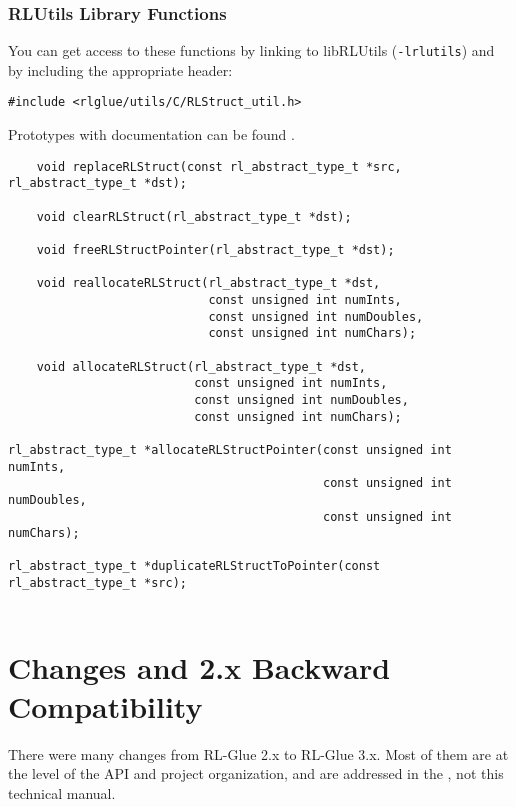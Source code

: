 \documentclass[11pt]{article}
\begin{document}
\subsubsection{RLUtils Library Functions}
\label{sec:util-functions}
You can get access to these functions by linking to libRLUtils (\texttt{-lrlutils}) and by including the appropriate header:

\begin{verbatim}
#include <rlglue/utils/C/RLStruct_util.h>
\end{verbatim}

Prototypes with documentation can be found .

\begin{verbatim}
	void replaceRLStruct(const rl_abstract_type_t *src, rl_abstract_type_t *dst);

	void clearRLStruct(rl_abstract_type_t *dst);

	void freeRLStructPointer(rl_abstract_type_t *dst);

	void reallocateRLStruct(rl_abstract_type_t *dst, 
                            const unsigned int numInts,
                            const unsigned int numDoubles,
                            const unsigned int numChars);

	void allocateRLStruct(rl_abstract_type_t *dst, 
                          const unsigned int numInts,
                          const unsigned int numDoubles, 
                          const unsigned int numChars);

rl_abstract_type_t *allocateRLStructPointer(const unsigned int numInts,
                                            const unsigned int numDoubles,
                                            const unsigned int numChars);

rl_abstract_type_t *duplicateRLStructToPointer(const rl_abstract_type_t *src);


\end{verbatim}



\section{Changes and 2.x Backward Compatibility}
There were many changes from RL-Glue 2.x to RL-Glue 3.x.  Most of them are at the level of the API and project organization, and are addressed in the , not this technical manual.
\end{document}
